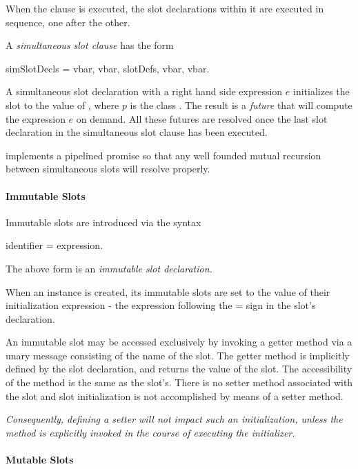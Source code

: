 \documentclass{article}
\begin{document}
When the clause is executed, the slot declarations within it are executed in sequence, one after the other.

A {\em simultaneous slot  clause} has the form 
\begin{newspeak}
simSlotDecls = vbar, vbar, slotDefs, vbar, vbar.
\end{newspeak}
 
A simultaneous slot declaration with a right hand side expression $e$ initializes the slot to the value of  , where $p$ is the class . The result is a {\em future} that will compute the expression $e$ on demand.   All these futures are resolved once the last slot declaration in the simultaneous slot  clause has been executed.

 implements a pipelined promise so that any well founded mutual recursion between simultaneous slots will resolve properly.


 

\paragraph{Immutable Slots}
\label{immutableSlots}

Immutable slots are introduced via the syntax
\begin{newspeak}
identifier = expression.
\end{newspeak}

The above form is an {\em immutable slot declaration.}

When an instance is created, its immutable slots are set to the value of their initialization expression - the expression following the = sign in the slot's declaration.

An immutable slot may be accessed exclusively by invoking a getter method via a unary message consisting of the name of the slot. The getter method is implicitly defined by the slot declaration, and returns the value of the slot. The accessibility of the method is the same as the slot's. There is no setter method associated with the slot and slot initialization is not accomplished by means of a setter method.

{\it
Consequently, defining a setter will not impact such an initialization, unless the method is explicitly invoked in the course of executing the initializer.
}


\paragraph{Mutable Slots}
\label{mutableSlots}
\end{document}
